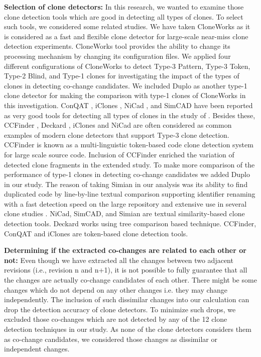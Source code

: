 \documentclass[review]{elsarticle}
\begin{document}
\vspace{1mm}
\textbf{Selection of clone detectors:} In this research, we wanted to examine those clone detection tools which are good in detecting all types of clones. To select such tools, we considered some related studies. We have taken CloneWorks \cite{CloneWorks-Jeff} as it is considered as a fast and flexible clone detector for large-scale near-miss clone detection experiments. CloneWorks tool provides the ability to change its processing mechanism by changing its configuration files. We applied four different configurations of CloneWorks to detect Type-3 Pattern, Type-3 Token, Type-2 Blind, and Type-1 clones for investigating the impact of the types of clones in detecting co-change candidates. We included Duplo \cite{DuploCloneDetection} as another type-1 clone detector for making the comparison with type-1 clones of CloneWorks in this investigation.  ConQAT \citep{conqat-clone-detecion}, iClones \cite{4812755iclones}, NiCad \citep{5970189Nicad}, and SimCAD \cite{6613857Simcad} have been reported as very good tools for detecting all types of clones in the study of \citet{jeff-evaluating}. Besides these, CCFinder \cite{CCFinderCloneDetection}, Deckard \cite{4222572Deckard}, iClones and NiCad are often considered as common examples of modern clone detectors that support Type-3 clone detection. CCFinder is known as a multi-linguistic token-based code clone detection system for large scale source code. Inclusion of CCFinder enriched the variation of detected clone fragments in the extended study.  To make more comparison of the performance of type-1 clones in detecting co-change candidates we added Duplo in our study. The reason of taking Simian \cite{simianlink} in our analysis was its ability to find duplicated code by line-by-line textual comparison supporting identifier renaming with a fast detection speed on the large repository and extensive use in several clone studies \cite{simian-used-1, Wang-2013-SBC-2491411-2491420, impact-clone-maintenance, Cheung-clones-javascript, cloning-gnome-project}. NiCad, SimCAD, and Simian are textual similarity-based clone detection tools. Deckard works using tree comparison based technique. CCFinder, ConQAT and iClones are token-based clone detection tools.

\vspace{1mm}
\textbf{Determining if the extracted co-changes are related to each other or not:} Even though we have extracted all the changes between two adjacent revisions (i.e., revision n and n+1), it is not possible to fully guarantee that all the changes are actually co-change candidates of each other. There might be some changes which do not depend on any other changes i.e. they may change independently. The inclusion of such dissimilar changes into our calculation can drop the detection accuracy of clone detectors. To minimize such drops, we excluded those co-changes which are not detected by any of the 12 clone detection techniques in our study. As none of the clone detectors considers them as co-change candidates, we considered those changes as dissimilar or independent changes. 
\end{document}
